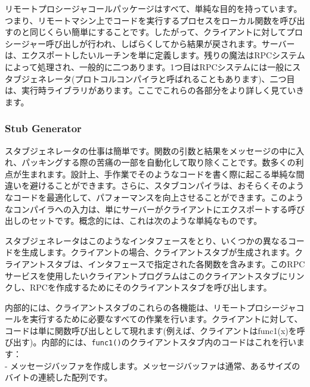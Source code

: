 リモートプロシージャコールパッケージはすべて、単純な目的を持っています。つまり、リモートマシン上でコードを実行するプロセスをローカル関数を呼び出すのと同じくらい簡単にすることです。したがって、クライアントに対してプロシージャー呼び出しが行われ、しばらくしてから結果が戻されます。サーバーは、エクスポートしたいルーチンを単に定義します。残りの魔法はRPCシステムによって処理され、一般的に二つあります。1つ目はRPCシステムには一般にスタブジェネレータ(プロトコルコンパイラと呼ばれることもあります)、二つ目は、実行時ライブラリがあります。ここでこれらの各部分をより詳しく見ていきます。

\hypertarget{stub-generator}{%
\subsubsection*{Stub Generator}\label{stub-generator}}

スタブジェネレータの仕事は簡単です。関数の引数と結果をメッセージの中に入れ、パッキングする際の苦痛の一部を自動化して取り除くことです。数多くの利点が生まれます。設計上、手作業でそのようなコードを書く際に起こる単純な間違いを避けることができます。さらに、スタブコンパイラは、おそらくそのようなコードを最適化して、パフォーマンスを向上させることができます。このようなコンパイラへの入力は、単にサーバーがクライアントにエクスポートする呼び出しのセットです。概念的には、これは次のような単純なものです。

\begin{Shaded}
\begin{Highlighting}[]
\NormalTok{\};}
\end{Highlighting}
\end{Shaded}

スタブジェネレータはこのようなインタフェースをとり、いくつかの異なるコードを生成します。クライアントの場合、クライアントスタブが生成されます。クライアントスタブは、インタフェースで指定された各関数を含みます。このRPCサービスを使用したいクライアントプログラムはこのクライアントスタブにリンクし、RPCを作成するためにそのクライアントスタブを呼び出します。

内部的には、クライアントスタブのこれらの各機能は、リモートプロシージャコールを実行するために必要なすべての作業を行います。クライアントに対して、コードは単に関数呼び出しとして現れます(例えば、クライアントはfunc1(x)を呼び出す)。内部的には、\texttt{func1()}のクライアントスタブ内のコードはこれを行います：\\
-
メッセージバッファを作成します。メッセージバッファは通常、あるサイズのバイトの連続した配列です。

